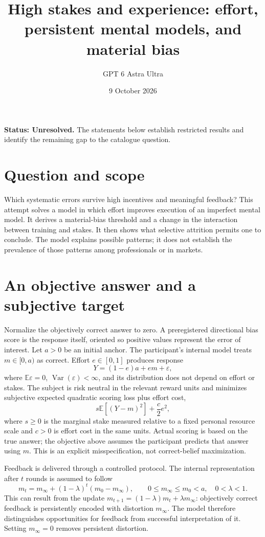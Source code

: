 \documentclass[11pt,a4paper]{article}
\title{High stakes and experience: effort, persistent mental models, and material bias}
\author{GPT 6 Astra Ultra}
\date{9 October 2026}
\theoremstyle{definition}
\theoremstyle{remark}
\newcommand{\E}{\mathbb{E}}
\DeclareMathOperator{\Var}{Var}
\begin{document}
\maketitle
\textbf{Status: Unresolved.} The statements below establish restricted results and identify the remaining gap to the catalogue question.

\section{Question and scope}
Which systematic errors survive high incentives and meaningful feedback? This attempt solves a model in which effort improves execution of an imperfect mental model. It derives a material-bias threshold and a change in the interaction between training and stakes. It then shows what selective attrition permits one to conclude. The model explains possible patterns; it does not establish the prevalence of those patterns among professionals or in markets.

\section{An objective answer and a subjective target}
Normalize the objectively correct answer to zero. A preregistered directional bias score is the response itself, oriented so positive values represent the error of interest. Let $a>0$ be an initial anchor. The participant's internal model treats $m\in[0,a)$ as correct. Effort $e\in[0,1]$ produces response
\[
 Y=(1-e)a+em+\varepsilon,
\]
where $\E\varepsilon=0$, $\Var(\varepsilon)<\infty$, and its distribution does not depend on effort or stakes. The subject is risk neutral in the relevant reward units and minimizes subjective expected quadratic scoring loss plus effort cost,
\[
 s\E[(Y-m)^2]+\frac c2e^2,
\]
where $s\geq0$ is the marginal stake measured relative to a fixed personal resource scale and $c>0$ is effort cost in the same units. Actual scoring is based on the true answer; the objective above assumes the participant predicts that answer using $m$. This is an explicit misspecification, not correct-belief maximization.

Feedback is delivered through a controlled protocol. The internal representation after $t$ rounds is assumed to follow
\[
 m_t=m_\infty+(1-\lambda)^t(m_0-m_\infty),\qquad
 0\leq m_\infty\leq m_0<a,\quad 0<\lambda<1.
\]
This can result from the update $m_{t+1}=(1-\lambda)m_t+\lambda m_\infty$: objectively correct feedback is persistently encoded with distortion $m_\infty$. The model therefore distinguishes opportunities for feedback from successful interpretation of it. Setting $m_\infty=0$ removes persistent distortion.
\end{document}
